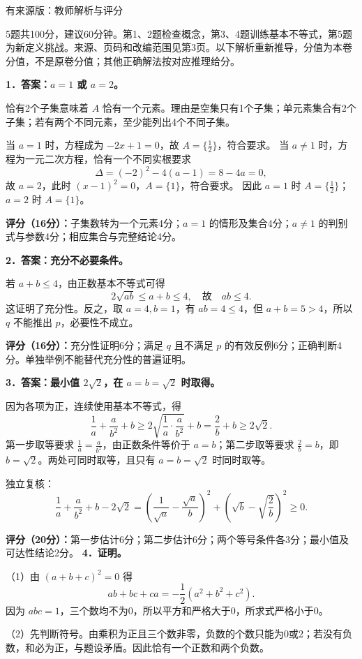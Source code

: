 \documentclass[UTF8,a4paper,11pt]{ctexart}
\begin{document}
\begin{center}{\LARGE 有来源版：教师解析与评分}\end{center}
5题共100分，建议60分钟。第1、2题检查概念，第3、4题训练基本不等式，第5题为新定义挑战。来源、页码和改编范围见第3页。以下解析重新推导，分值为本卷分值，不是原卷分值；其他正确解法按对应推理给分。

\textbf{1．答案：$a=1$ 或 $a=2$。}

恰有2个子集意味着 $A$ 恰有一个元素。理由是空集只有1个子集；单元素集合有2个子集；若有两个不同元素，至少能列出4个不同子集。

当 $a=1$ 时，方程成为 $-2x+1=0$，故 $A=\{\frac12\}$，符合要求。
当 $a\ne1$ 时，方程为一元二次方程，恰有一个不同实根要求
\[\Delta=(-2)^2-4(a-1)=8-4a=0,\]
故 $a=2$，此时 $(x-1)^2=0$，$A=\{1\}$，符合要求。
因此 $a=1$ 时 $A=\{\frac12\}$；$a=2$ 时 $A=\{1\}$。

\textbf{评分（16分）：}子集数转为一个元素4分；$a=1$ 的情形及集合4分；$a\ne1$ 的判别式与参数4分；相应集合与完整结论4分。

\textbf{2．答案：充分不必要条件。}

若 $a+b\le4$，由正数基本不等式可得
\[2\sqrt{ab}\le a+b\le4,\quad\text{故}\quad ab\le4.\]
这证明了充分性。反之，取 $a=4,b=1$，有 $ab=4\le4$，但 $a+b=5>4$，所以 $q$ 不能推出 $p$，必要性不成立。

\textbf{评分（16分）：}充分性证明6分；满足 $q$ 且不满足 $p$ 的有效反例6分；正确判断4分。单独举例不能替代充分性的普遍证明。

\textbf{3．答案：最小值 $2\sqrt2$，在 $a=b=\sqrt2$ 时取得。}

因为各项为正，连续使用基本不等式，得
\[\frac1a+\frac a{b^2}+b\ge2\sqrt{\frac1a\cdot\frac a{b^2}}+b
=\frac2b+b\ge2\sqrt2.\]
第一步取等要求 $\frac1a=\frac a{b^2}$，由正数条件等价于 $a=b$；第二步取等要求 $\frac2b=b$，即 $b=\sqrt2$。两处可同时取等，且只有 $a=b=\sqrt2$ 时同时取等。

独立复核：
\[\frac1a+\frac a{b^2}+b-2\sqrt2
=\left(\frac1{\sqrt a}-\frac{\sqrt a}{b}\right)^2
+\left(\sqrt b-\sqrt{\frac2b}\right)^2\ge0.\]

\textbf{评分（20分）：}第一步估计6分；第二步估计6分；两个等号条件各3分；最小值及可达性结论2分。
\newpage
\textbf{4．证明。}

（1）由 $(a+b+c)^2=0$ 得
\[ab+bc+ca=-\frac12(a^2+b^2+c^2).\]
因为 $abc=1$，三个数均不为0，所以平方和严格大于0，所求式严格小于0。

（2）先判断符号。由乘积为正且三个数非零，负数的个数只能为0或2；若没有负数，和必为正，与题设矛盾。因此恰有一个正数和两个负数。
\end{document}
